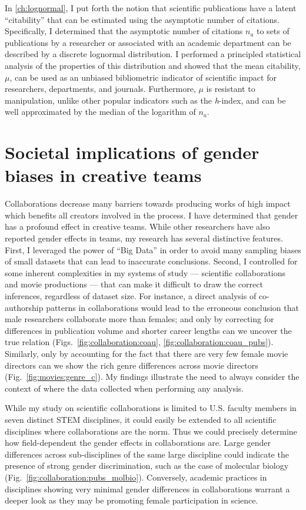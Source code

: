 In \autoref{ch:lognormal}, I put forth the notion that scientific publications have a latent ``citability'' that can be estimated using the asymptotic number of citations. Specifically, I determined that the asymptotic number of citations $n_a$ to sets of publications by a researcher or associated with an academic department can be described by a discrete lognormal distribution. I performed a principled statistical analysis of the properties of this distribution and showed that the mean citability, $\mu$, can be used as an unbiased bibliometric indicator of scientific impact for researchers, departments, and journals. Furthermore, $\mu$ is resistant to manipulation, unlike other popular indicators such as the \emph{h}-index, and can be well approximated by the median of the logarithm of $n_a$.


\section{Societal implications of gender biases in creative teams}

Collaborations decrease many barriers towards producing works of high impact which benefits all creators involved in the process. I have determined that gender has a profound effect in creative teams. While other researchers have also reported gender effects in teams, my research has several distinctive features. First, I leveraged the power of ``Big Data'' in order to avoid many sampling biases of small datasets that can lead to inaccurate conclusions. Second, I controlled for some inherent complexities in my systems of study --- scientific collaborations and movie productions --- that can make it difficult to draw the correct inferences, regardless of dataset size. For instance, a direct analysis of co-authorship patterns in collaborations would lead to the erroneous conclusion that male researchers collaborate more than females; and only by correcting for differences in publication volume and shorter career lengths can we uncover the true relation (Figs.~\ref{fig:collaboration:coau}, \ref{fig:collaboration:coau_pubs}). Similarly, only by accounting for the fact that there are very few female movie directors can we show the rich genre differences across movie directors (Fig.~\ref{fig:movies:genre_c}). My findings illustrate the need to always consider the context of where the data collected when performing any analysis.

While my study on scientific collaborations is limited to U.S. faculty members in seven distinct STEM disciplines, it could easily be extended to all scientific disciplines where collaborations are the norm. Thus we could precisely determine how field-dependent the gender effects in collaborations are. Large gender differences across sub-disciplines of the same large discipline could indicate the presence of strong gender discrimination, such as the case of molecular biology (Fig.~\ref{fig:collaboration:pubs_molbio}). Conversely, academic practices in disciplines showing very minimal gender differences in collaborations warrant a deeper look as they may be promoting female participation in science.

